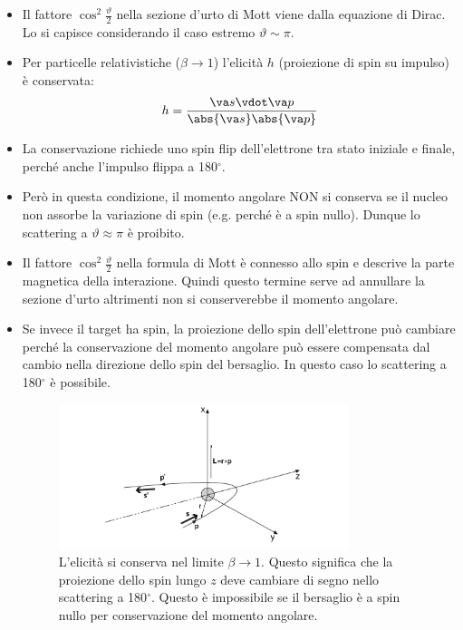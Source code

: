 \begin{itemize}
    \item Il fattore $\cos^2\frac\vartheta2$ nella sezione d'urto di Mott viene dalla equazione di Dirac. Lo si capisce considerando il caso estremo $\vartheta\sim\pi$.
    \item Per particelle relativistiche ($\beta\to1$) l'elicità $h$ (proiezione di spin su impulso) è conservata:
    \begin{equation*}
    h=\frac{\va s\vdot \va p}{\abs{\va s}\abs{\va p}}
    \end{equation*}
    \item La conservazione richiede uno spin flip dell'elettrone tra stato iniziale e finale, perché anche l'impulso flippa a 180$^\circ$.
    \item Però in questa condizione, il momento angolare NON si conserva se il nucleo non assorbe la variazione di spin (e.g. perché è a spin nullo). Dunque lo scattering a $\vartheta\approx\pi$ è proibito.
    \item Il fattore $\cos^2\frac\vartheta2$ nella formula di Mott è connesso allo spin e descrive la parte magnetica della interazione. Quindi questo termine serve ad annullare la sezione d'urto altrimenti non si conserverebbe il momento angolare.
    \item Se invece il target ha spin, la proiezione dello spin dell'elettrone può cambiare perché la conservazione del momento angolare può essere compensata dal cambio nella direzione dello spin del bersaglio. In questo caso lo scattering a 180$^\circ$ è possibile.
    \begin{figure}[H]
        \centering
        \includegraphics[width=0.8\textwidth]{immagini/fig_elic_mott.png}
        \caption{L'elicità si conserva nel limite $\beta\to1$. Questo significa che la proiezione dello spin lungo $z$ deve cambiare di segno nello scattering a 180$^\circ$. Questo è impossibile se il bersaglio è a spin nullo per conservazione del momento angolare.}
    \end{figure}
\end{itemize}
